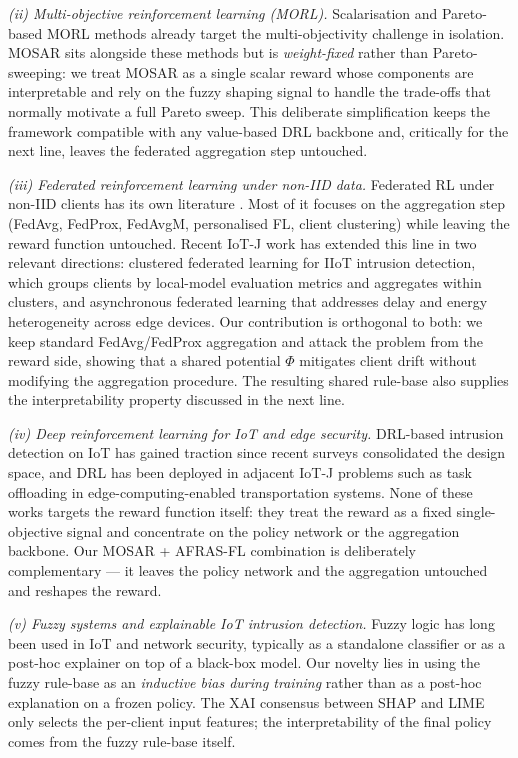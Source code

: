 \documentclass[journal]{IEEEtran}
\begin{document}
\emph{(ii) Multi-objective reinforcement learning (MORL).}
Scalarisation and Pareto-based MORL methods\cite{li2022review}
already target the multi-objectivity challenge in isolation. MOSAR
sits alongside these methods but is \emph{weight-fixed} rather than
Pareto-sweeping: we treat MOSAR as a single scalar reward whose
components are interpretable and rely on the fuzzy shaping signal
to handle the trade-offs that normally motivate a full Pareto sweep.
This deliberate simplification keeps the framework compatible with
any value-based DRL backbone and, critically for the next line,
leaves the federated aggregation step untouched.

\emph{(iii) Federated reinforcement learning under non-IID data.}
Federated RL under non-IID clients has its own literature
\cite{mcmahan2017fedavg,li2020fedprox,hsu2019fedavgm,
kairouz2021advances,li2024federated_noniid,friha2024fl_iot_survey,
yuan2024decentralized}. Most of it focuses on the aggregation step
(FedAvg, FedProx, FedAvgM, personalised FL, client clustering)
while leaving the reward function untouched. Recent IoT-J work has
extended this line in two relevant directions: clustered federated
learning for IIoT intrusion detection, which groups clients by
local-model evaluation metrics and aggregates within
clusters\cite{shan2024cflids}, and asynchronous federated learning
that addresses delay and energy heterogeneity across edge
devices\cite{liu2024delay}. Our contribution is orthogonal to both:
we keep standard FedAvg/FedProx aggregation and attack the problem
from the reward side, showing that a shared potential $\Phi$
mitigates client drift without modifying the aggregation procedure.
The resulting shared rule-base also supplies the interpretability
property discussed in the next line.

\emph{(iv) Deep reinforcement learning for IoT and edge security.}
DRL-based intrusion detection on IoT has gained traction since
recent surveys consolidated the design
space\cite{kaur2024intrusion,layeghy2024privacy}, and DRL has been
deployed in adjacent IoT-J problems such as task offloading in
edge-computing-enabled transportation
systems\cite{xu2024transedge}. None of these works targets the
reward function itself: they treat the reward as a fixed
single-objective signal and concentrate on the policy network or
the aggregation backbone. Our MOSAR + AFRAS-FL combination is
deliberately complementary --- it leaves the policy network and
the aggregation untouched and reshapes the reward.

\emph{(v) Fuzzy systems and explainable IoT intrusion detection.}
Fuzzy logic has long been used in IoT and network security,
typically as a standalone classifier or as a post-hoc explainer on
top of a black-box model\cite{lundberg2017shap,ribeiro2016lime,
arrieta2020xai,abdulrahman2024xai_ids,bouacida2024flids_survey,
zahir2025fl_ids_acm}. Our novelty lies in using the fuzzy
rule-base as an \emph{inductive bias during training} rather than
as a post-hoc explanation on a frozen policy. The XAI consensus
between SHAP\cite{lundberg2017shap} and
LIME\cite{ribeiro2016lime} only selects the per-client input
features; the interpretability of the final policy comes from the
fuzzy rule-base itself.
\end{document}
